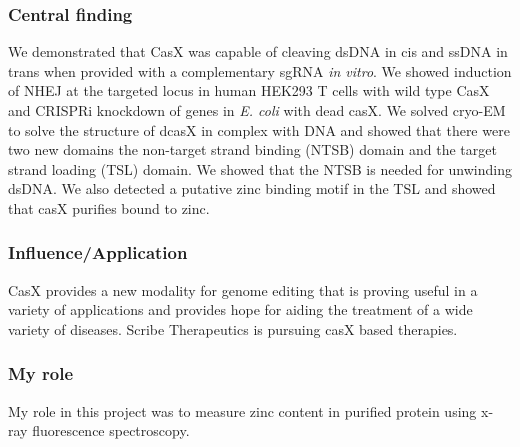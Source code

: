 \documentclass{article}
\begin{document}
\subsubsection{Central finding}
We demonstrated that CasX was capable of cleaving dsDNA in cis and ssDNA in trans when provided with a complementary sgRNA \textit{in vitro}.
We showed induction of NHEJ at the targeted locus in human HEK293 T cells with wild type CasX and CRISPRi knockdown of genes in \textit{E. coli} with dead casX.
We solved cryo-EM to solve the structure of dcasX in complex with DNA and showed that there were two new domains the non-target strand binding (NTSB) domain and the target strand loading (TSL) domain.
We showed that the NTSB is needed for unwinding dsDNA.
We also detected a putative zinc binding motif in the TSL and showed that casX purifies bound to zinc.
%
\subsubsection{Influence/Application}
CasX provides a new modality for genome editing that is proving useful in a variety of applications and provides hope for aiding the treatment of a wide variety of diseases.
Scribe Therapeutics is pursuing casX based therapies.
%
\subsubsection{My role}
My role in this project was to measure zinc content in purified protein using x-ray fluorescence spectroscopy.
%
\nocite{Liu2019-nk}
\printbibliography[heading=none]
\end{document}
